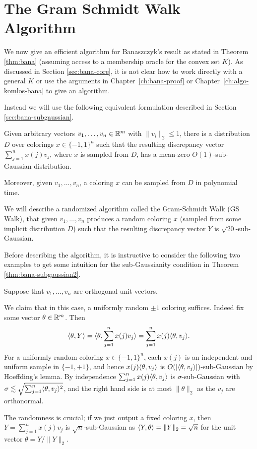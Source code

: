 
\chapter{The Gram Schmidt Walk Algorithm}
\label{ch:gram-schmidt}
We now give an efficient algorithm for Banaszczyk's result as stated
in Theorem \ref{thm:bana} (assuming access to a membership oracle for
the convex set $K$).
As discussed in Section \ref{sec:bana-core}, it is not clear how to
work directly with a general $K$ or use the arguments in
Chapter~\ref{ch:bana-proof} or Chapter~\ref{ch:algo-komlos-bana} to give an algorithm. 

Instead we will use the following equivalent formulation described in Section \ref{sec:bana-subgaussian}. 



\begin{theorem}
\label{thm:bana-subgaussian2}
Given arbitrary vectors $v_1,\ldots,v_n \in \mathbb{R}^m$ with
$\|v_i\|_2 \leq 1$, there is a distribution $D$ over colorings
$x \in \{-1,1\}^n$ such that the resulting discrepancy vector
$\sum_{j=1}^n x(j) v_j$, where $x$ is sampled from $D$, has a
mean-zero $O(1)$-sub-Gaussian distribution.

Moreover, given $v_1, \ldots, v_n$, a coloring $x$ can be sampled from
$D$ in polynomial time.
\end{theorem}

We will describe a randomized algorithm called the Gram-Schmidt Walk (GS Walk), that given $v_1,\ldots,v_n$ produces a random  coloring $x$ (sampled from some implicit distribution $D$) such that the resulting discrepancy vector $Y$ is $\sqrt{20}$-sub-Gaussian.


\smallskip 
Before describing the algorithm, it is instructive to consider the following two examples to get some intuition for the sub-Gaussianity condition in Theorem \ref{thm:bana-subgaussian2}. %

\begin{example}
\label{ex:gs-1}
    Suppose that $v_1,\ldots,v_n$ are orthogonal unit vectors. 
    
    We claim that in this case, a uniformly random $\pm 1$ coloring suffices. Indeed fix some vector $\theta \in \mathbb{R}^m$. Then  
    \[\langle \theta,Y\rangle=
\langle \theta, \sum_{j=1}^n x(j) v_j\rangle = \sum_{j=1}^n  x(j) \langle \theta,v_j\rangle.\]
For a uniformly random coloring $x \in \{-1,1\}^n$, each $x(j)$ is an
independent and uniform sample in $\{-1,+1\}$, and hence $x(j) \langle \theta,v_j\rangle$
is $O(|\langle \theta,v_j\rangle|)$-sub-Gaussian by Hoeffding's lemma. By
independence $\sum_{j=1}^n  x(j) \langle \theta,v_j\rangle$ is $\sigma$-sub-Gaussian
with $\sigma\lesssim \sqrt{\sum_{j=1}^n \langle  \theta, v_j\rangle^2 }$, and the
right hand side is at most $ \|\theta\|_2$  as the $v_j$ are orthonormal.

\begin{remark}
    The randomness is crucial; if we just output a fixed coloring $x$,
    then $Y=\sum_{j=1}^n x(j)v_j$ is $\sqrt{n}$-sub-Gaussian as
    $\langle Y,\theta\rangle = \|Y\|_2 = \sqrt{n}$ for the unit vector $\theta = Y/\|Y\|_2$.
\end{remark} 
\end{example} 

